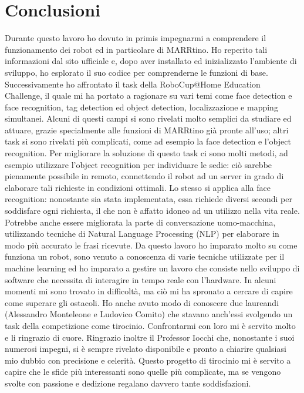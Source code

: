 \documentclass[italian, twoside]{sapthesis} %
\begin{document}
\chapter{Conclusioni}
\label{chap:6}
\lettrine[lines=2, findent=3pt, nindent=0pt]{D}{}urante questo lavoro ho dovuto in primis impegnarmi a comprendere il funzionamento dei robot ed in particolare di MARRtino. Ho reperito tali informazioni dal sito ufficiale e, dopo aver installato ed inizializzato l'ambiente di sviluppo, ho esplorato il suo codice per comprenderne le funzioni di base. Successivamente ho affrontato il task della RoboCup@Home Education Challenge, il quale mi ha portato a ragionare su vari temi come face detection e face recognition, tag detection ed object detection, localizzazione e mapping simultanei. Alcuni di questi campi si sono rivelati molto semplici da studiare ed attuare, grazie specialmente alle funzioni di MARRtino già pronte all'uso; altri task si sono rivelati più complicati, come ad esempio la face detection e l'object recognition. Per migliorare la soluzione di questo task ci sono molti metodi, ad esempio utilizzare l'object recognition per individuare le sedie: ciò sarebbe pienamente possibile in remoto, connettendo il robot ad un server in grado di elaborare tali richieste in condizioni ottimali. Lo stesso si applica alla face recognition: nonostante sia stata implementata, essa richiede diversi secondi per soddisfare ogni richiesta, il che non è affatto idoneo ad un utilizzo nella vita reale. Potrebbe anche essere migliorata la parte di conversazione uomo-macchina, utilizzando tecniche di Natural Language Processing (NLP) per elaborare in modo più accurato le frasi ricevute. Da questo lavoro ho imparato molto su come funziona un robot, sono venuto a conoscenza di varie tecniche utilizzate per il machine learning ed ho imparato a gestire un lavoro che consiste nello sviluppo di software che necessita di interagire in tempo reale con l'hardware. In alcuni momenti mi sono trovato in difficoltà, ma ciò mi ha spronato a cercare di capire come superare gli ostacoli. Ho anche avuto modo di conoscere due laureandi (Alessandro Monteleone e Ludovico Comito) che stavano anch'essi svolgendo un task della competizione come tirocinio. Confrontarmi con loro mi è servito molto e li ringrazio di cuore. Ringrazio inoltre il Professor Iocchi che, nonostante i suoi numerosi impegni, si è sempre rivelato disponibile e pronto a chiarire qualsiasi mio dubbio con precisione e celerità. Questo progetto di tirocinio mi è servito a capire che le sfide più interessanti sono quelle più complicate, ma se vengono svolte con passione e dedizione regalano davvero tante soddisfazioni.

\backmatter
{}



\end{document}
